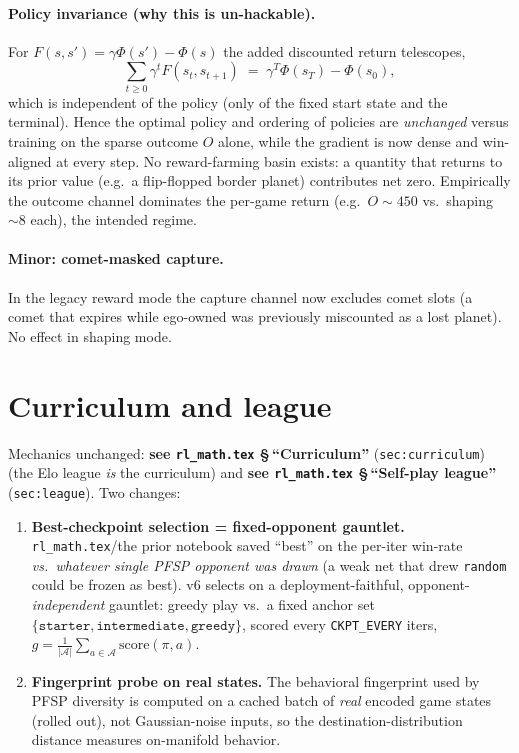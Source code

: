 \documentclass[11pt]{article}
\newcommand{\cd}[1]{\texttt{#1}}
\newcommand{\rlref}[2]{\textbf{see \texttt{rl\_math.tex} \S\,``#1''} (\texttt{#2})}
\begin{document}
\paragraph{Policy invariance (why this is un-hackable).} For $F(s,s')=\gamma\Phi(s')-\Phi(s)$ the added
discounted return telescopes,
\begin{equation}
\sum_{t\ge0}\gamma^t F(s_t,s_{t+1}) \;=\; \gamma^{T}\Phi(s_T)-\Phi(s_0),
\end{equation}
which is independent of the policy (only of the fixed start state and the terminal). Hence the optimal
policy and ordering of policies are \emph{unchanged} versus training on the sparse outcome $O$ alone, while
the gradient is now dense and win-aligned at every step. No reward-farming basin exists: a quantity that
returns to its prior value (e.g.\ a flip-flopped border planet) contributes net zero. Empirically the
outcome channel dominates the per-game return (e.g.\ $O\!\sim\!450$ vs.\ shaping $\sim\!8$ each), the
intended regime.

\paragraph{Minor: comet-masked capture.} In the legacy reward mode the capture channel now excludes comet
slots (a comet that expires while ego-owned was previously miscounted as a lost planet). No effect in
shaping mode.

\section{Curriculum and league}\label{v6:league}
Mechanics unchanged: \rlref{Curriculum}{sec:curriculum} (the Elo league \emph{is} the curriculum) and
\rlref{Self-play league}{sec:league}. Two changes:
\begin{enumerate}[nosep,leftmargin=1.4em]
  \item \textbf{Best-checkpoint selection = fixed-opponent gauntlet.} \texttt{rl\_math.tex}/the prior
        notebook saved ``best'' on the per-iter win-rate \emph{vs.\ whatever single PFSP opponent was
        drawn} (a weak net that drew \cd{random} could be frozen as best). v6 selects on a
        deployment-faithful, opponent-\emph{independent} gauntlet: greedy play vs.\ a fixed anchor set
        $\{\cd{starter},\cd{intermediate},\cd{greedy}\}$, scored every \cd{CKPT\_EVERY} iters,
        $g=\frac1{|\mathcal A|}\sum_{a\in\mathcal A}\mathrm{score}(\pi,a)$.
  \item \textbf{Fingerprint probe on real states.} The behavioral fingerprint used by PFSP diversity is
        computed on a cached batch of \emph{real} encoded game states (rolled out), not Gaussian-noise
        inputs, so the destination-distribution distance measures on-manifold behavior.
\end{enumerate}
\end{document}
